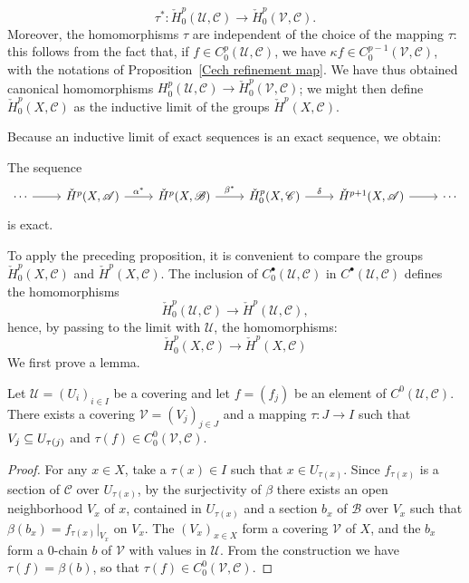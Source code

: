 \[\tau^*:\check{H}^p_0(\mathcal{U},\mathscr{C})\to\check{H}^p_0(\mathcal{V},\mathscr{C}).\]
Moreover, the homomorphisms $\tau$ are independent of the choice of the mapping $\tau$: this follows from the fact that, if $f\in C^p_0(\mathcal{U},\mathscr{C})$, we have $\kappa f\in C^{p-1}_0(\mathcal{V},\mathscr{C})$, with the notations of Proposition~\ref{Cech refinement map}. We have thus obtained canonical homomorphisms $H^p_0(\mathcal{U},\mathscr{C})\to\check{H}^p_0(\mathcal{V},\mathscr{C})$; we might then define $\check{H}^p_0(X,\mathscr{C})$ as the inductive limit of the groups $\check{H}^p(X,\mathscr{C})$.\par
Because an inductive limit of exact sequences is an exact sequence, we obtain:
\begin{proposition}
The sequence
\[\begin{tikzcd}
\cdots\ar[r]&\check{H}^p(X,\mathscr{A})\ar[r,"\alpha^*"]&\check{H}^p(X,\mathscr{B})\ar[r,"\beta^*"]&\check{H}^p_0(X,\mathscr{C})\ar[r,"\delta"]&\check{H}^{p+1}(X,\mathscr{A})\ar[r]&\cdots
\end{tikzcd}\]
is exact.
\end{proposition}
To apply the preceding proposition, it is convenient to compare the groups
$\check{H}^p_0(X,\mathscr{C})$ and $\check{H}^p(X,\mathscr{C})$. The inclusion of $C_0^\bullet(\mathcal{U},\mathscr{C})$ in $C^\bullet(\mathcal{U},\mathscr{C})$ defines the homomorphisms
\[\check{H}_0^p(\mathcal{U},\mathscr{C})\to\check{H}^p(\mathcal{U},\mathscr{C}),\]
hence, by passing to the limit with $\mathcal{U}$, the homomorphisms:
\[\check{H}_0^p(X,\mathscr{C})\to\check{H}^p(X,\mathscr{C})\]
We first prove a lemma.
\begin{lemma}\label{Cech C^0_0 lem}
Let $\mathcal{U}=(U_i)_{i\in I}$ be a covering and let $f=(f_j)$ be an element of $C^0(\mathcal{U},\mathscr{C})$. There exists a covering $\mathcal{V}=(V_j)_{j\in J}$ and a mapping $\tau:J\to I$ such that $V_j\subseteq U_{\tau(j)}$ and $\tau(f)\in C^0_0(\mathcal{V},\mathscr{C})$.
\end{lemma}
\begin{proof}
For any $x\in X$, take a $\tau(x)\in I$ such that $x\in U_{\tau(x)}$. Since $f_{\tau(x)}$ is a section of $\mathscr{C}$ over $U_{\tau(x)}$, by the surjectivity of $\beta$ there exists an open neighborhood $V_x$ of $x$, contained in $U_{\tau(x)}$ and a section $b_x$ of $\mathscr{B}$ over $V_x$ such that $\beta(b_x)=f_{\tau(x)}|_{V_x}$ on $V_x$. The $(V_x)_{x\in X}$ form a covering $\mathcal{V}$ of $X$, and the $b_x$ form a $0$-chain $b$ of $\mathcal{V}$ with values in $\mathcal{U}$. From the construction we have $\tau(f)=\beta(b)$, so that $\tau(f)\in C^0_0(\mathcal{V},\mathscr{C})$.
\end{proof}

